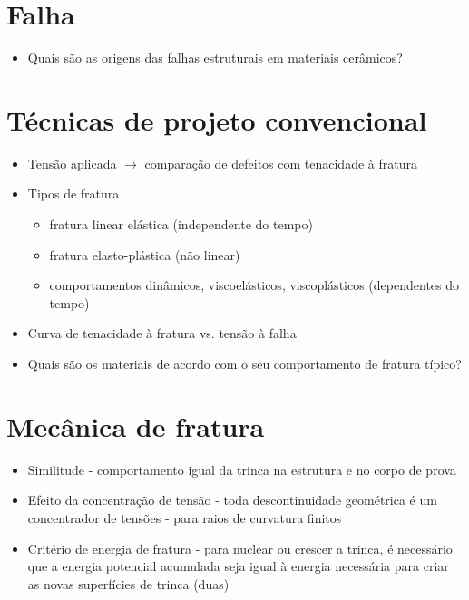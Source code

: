 
\begin{multicols*}{2}

    \section*{Falha}

    \begin{itemize}
        \item Quais são as origens das falhas estruturais em materiais cerâmicos?
    \end{itemize}

    \section*{Técnicas de projeto convencional}

    \begin{itemize}
        \item Tensão aplicada $\rightarrow$ comparação de defeitos com tenacidade à fratura
        \item Tipos de fratura
        \begin{itemize}
            \item fratura linear elástica (independente do tempo)
            \item fratura elasto-plástica (não linear)
            \item comportamentos dinâmicos, viscoelásticos, viscoplásticos (dependentes do tempo)
        \end{itemize}
        \item Curva de tenacidade à fratura vs. tensão à falha
        \item Quais são os materiais de acordo com o seu comportamento de fratura típico?
    \end{itemize}

    \section*{Mecânica de fratura}

    \begin{itemize}
        \item Similitude - comportamento igual da trinca na estrutura e no corpo de prova
        \item Efeito da concentração de tensão - toda descontinuidade geométrica é um concentrador de tensões - para raios de curvatura finitos
        \item Critério de energia de fratura - para nuclear ou crescer a trinca, é necessário que a energia potencial acumulada seja igual à energia necessária para criar as novas superfícies de trinca (duas)
    \end{itemize}


\end{multicols*}
